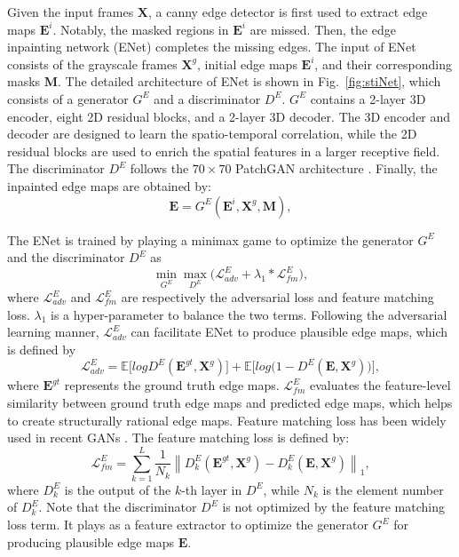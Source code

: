 Given the input frames $\boldsymbol{X}$, a canny edge detector is first used to extract edge maps $\boldsymbol{E}^{i}$. Notably, the masked regions in $\boldsymbol{E}^{i}$ are missed. 
Then, the edge inpainting network (ENet) completes the missing edges.
The input of ENet consists of the grayscale frames $\boldsymbol{X}^{g}$, initial edge maps $\boldsymbol{E}^{i}$, and their corresponding masks $\boldsymbol{M}$.
%
The detailed architecture of ENet is shown in Fig.~\ref{fig:stiNet}, which consists of a generator $G^E$ and a discriminator $D^E$.
$G^E$ contains a 2-layer 3D encoder, eight 2D residual blocks, and a 2-layer 3D decoder. 
The 3D encoder and decoder are designed to learn the spatio-temporal correlation, while the 2D residual blocks are used to enrich the spatial features in a larger receptive field. The discriminator $D^E$ follows the $70\times 70$ PatchGAN architecture \cite{Isola_2017_CVPR}. 
Finally, the inpainted edge maps are obtained by:
\begin{equation}
\label{eq:edgenet}
\boldsymbol{E}=G^E(\boldsymbol{E}^{i},\boldsymbol{X}^{g},\boldsymbol{M}),
\end{equation}

The ENet is trained by playing a minimax game to optimize the generator $G^E$ and the discriminator $D^E$ as
\begin{equation}
\label{eq:loss_e}
\min\limits_{G^E} \max \limits_{D^E} \big(\mathcal{L}^E_{adv}+\lambda_1 * \mathcal{L}^E_{fm}\big),
\end{equation}
where $\mathcal{L}^E_{adv}$ and $\mathcal{L}^E_{fm}$ are respectively the adversarial loss and feature matching loss. 
$\lambda_1$ is a hyper-parameter to balance the two terms.
%
Following the adversarial learning manner, $\mathcal{L}^E_{adv}$ can facilitate ENet to produce plausible edge maps, which is defined by
\begin{equation} \label{eq:edge_adver}
\mathcal{L}^E_{adv}  =\mathbb{E}\big[logD^E(\boldsymbol{E}^{gt},\boldsymbol{X}^{g})\big] +\mathbb{E} \big[log\big(1-D^E ( \boldsymbol{E},\boldsymbol{X}^{g})\big)\big],
\end{equation}
where $\boldsymbol{E}^{gt}$ represents the ground truth edge maps. $\mathcal{L}^E_{fm}$ evaluates the feature-level similarity between ground truth edge maps and predicted edge maps, which helps to create structurally rational edge maps. 
Feature matching loss has been widely used in recent GANs \cite{wang2018high}.
The feature matching loss is defined by:
\begin{equation}
\label{eq:edge_fm}
\mathcal{L}^E_{fm}=\sum_{k=1}^L{\frac{1}{N_k}\left\| D^E_k(\boldsymbol{E}^{gt},\boldsymbol{X}^{g})- D^E_k(\boldsymbol{E},\boldsymbol{X}^{g})\right\|_1},
\end{equation}
where $D^E_k$ is the output of the $k$-th layer in $D^E$, while $N_k$ is the element number of $D^E_k$. 
Note that the discriminator $D^E$ is not optimized by the feature matching loss term. It plays as a feature extractor to optimize the generator $G^E$ for producing plausible edge maps $\boldsymbol{E}$.



